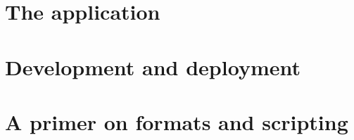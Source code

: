 \documentclass[a4paper,oneside,12pt]{memoir}
\begin{document}
\part{The application}
\label{part:application}









\part{Development and deployment}
\label{part:developmentanddeployment}




\part{A primer on formats and scripting}
\label{part:primer}



\end{document}
